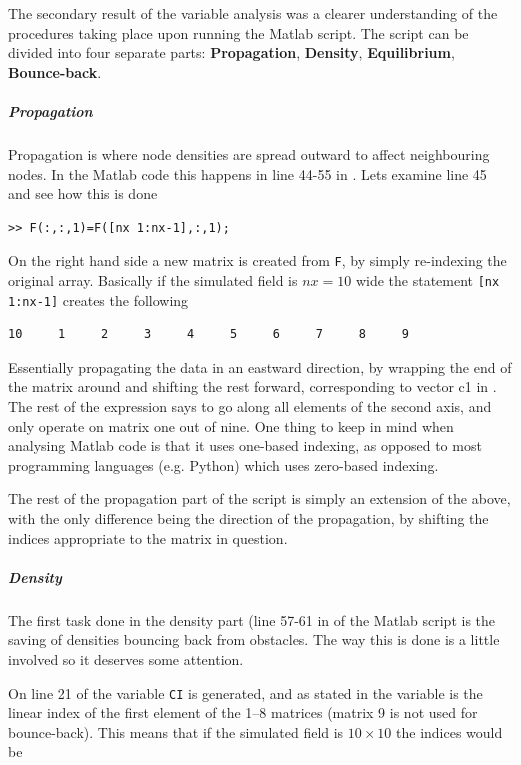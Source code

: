 The secondary result of the variable analysis was a clearer understanding of the procedures taking place upon running the Matlab script. The script can be divided into four separate parts: \textbf{Propagation}, \textbf{Density}, \textbf{Equilibrium}, \textbf{Bounce-back}.

\subparagraph{Propagation} 
Propagation is where node densities are spread outward to affect neighbouring nodes. In the Matlab code this happens in line 44-55 in . Lets examine line 45 and see how this is done

\begin{verbatim}
>> F(:,:,1)=F([nx 1:nx-1],:,1);
\end{verbatim}

On the right hand side a new matrix is created from \texttt{F}, by simply re-indexing the original array. Basically if the simulated field is $nx=10$ wide the statement \texttt{[nx 1:nx-1]} creates the following

\begin{verbatim}
10     1     2     3     4     5     6     7     8     9
\end{verbatim}

Essentially propagating the data in an eastward direction, by wrapping the end of the matrix around and shifting the rest forward, corresponding to vector c1 in . The rest of the expression says to go along all elements of the second axis, and only operate on matrix one out of nine. One thing to keep in mind when analysing Matlab code is that it uses one-based indexing, as opposed to most programming languages (e.g. Python) which uses zero-based indexing.

The rest of the propagation part of the script is simply an extension of the above, with the only difference being the direction of the propagation, by shifting the indices appropriate to the matrix in question.

\subparagraph*{Density}
The first task done in the density part (line 57-61 in  of the Matlab script is the saving of densities bouncing back from obstacles. The way this is done is a little involved so it deserves some attention.

On line 21 of  the variable \texttt{CI} is generated, and as stated in  the variable is the linear index of the first element of the 1--8 matrices (matrix 9 is not used for bounce-back). This means that if the simulated field is $10\times10$ the indices would be

